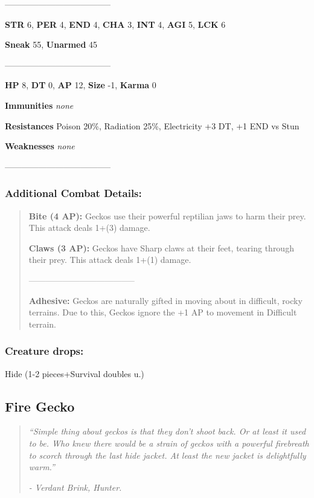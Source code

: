 \documentclass[11pt,a4paper,twocolumn]{book}
\begin{document}
	--------------------------------------

	\noindent
	\textbf{STR} 6, \textbf{PER} 4, \textbf{END} 4, \textbf{CHA} 3, \textbf{INT} 4, \textbf{AGI} 5, \textbf{LCK} 6
	
	\noindent
	\textbf{Sneak} 55, \textbf{Unarmed} 45
	
	--------------------------------------
	
	\noindent
	\textbf{HP} 8, \textbf{DT} 0, \textbf{AP} 12, \textbf{Size} -1, \textbf{Karma} 0
	
	
	\noindent
	\textbf{Immunities} \emph{none} %
	
	\noindent
	\textbf{Resistances} Poison 20\%, Radiation 25\%, Electricity +3 DT, +1 END vs Stun %
	
	\noindent
	\textbf{Weaknesses} \emph{none} %
	
	--------------------------------------
	
	\subsubsection*{Additional Combat Details:}
	\begin{verse}
		\textbf{Bite (4 AP):} Geckos use their powerful reptilian jaws to harm their prey. This attack deals 1+(3) damage.
		
		\textbf{Claws (3 AP):} Geckos have Sharp claws at their feet, tearing through their prey. This attack deals 1+(1) damage.  
		
		--------------------------------------
		
		\textbf{Adhesive:} Geckos are naturally gifted in moving about in difficult, rocky terrains. Due to this, Geckos ignore the +1 AP to movement in Difficult terrain.
		
	\end{verse}
	
	\subsubsection*{Creature drops:}
	Hide (1-2 pieces+Survival doubles u.)
	
	\vfill
	\subsection*{Fire Gecko}
	\begin{quote}
		\emph{``Simple thing about geckos is that they don't shoot back. Or at least it used to be. Who knew there would be a strain of geckos with a powerful firebreath to scorch through the last hide jacket. At least the new jacket is delightfully warm.''}
		
		\emph{- Verdant Brink, Hunter.}
	\end{quote}
	
\end{document}
